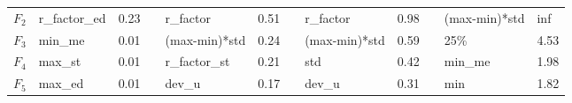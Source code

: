 \begin{table}[]
\begin{tabular}{|l|l|l|l|l|l|l|l|l|lll}
$F_2$                                        & \cellcolor[HTML]{FFCE93}r\_factor\_ed                            & \cellcolor[HTML]{FFCE93}0.23                                        &                                         & \cellcolor[HTML]{FFCE93}r\_factor                                & \cellcolor[HTML]{FFCE93}0.51                                        &                                         & \cellcolor[HTML]{FFCE93}r\_factor                                & \cellcolor[HTML]{FFCE93}0.98                                        & \multicolumn{1}{l|}{}                   & \multicolumn{1}{l|}{\cellcolor[HTML]{FFCE93}(max-min)*std}       & \multicolumn{1}{l|}{\cellcolor[HTML]{FFCE93} inf}                       \\ \cline{1-3} \cline{5-6} \cline{8-9} \cline{11-12} 
$F_3$                                        & \cellcolor[HTML]{FFCE93}min\_me                                  & \cellcolor[HTML]{FFCE93}0.01                                        &                                         & \cellcolor[HTML]{FFCE93}(max-min)*std                            & \cellcolor[HTML]{FFCE93}0.24                                        &                                         & \cellcolor[HTML]{FFCE93}(max-min)*std                            & \cellcolor[HTML]{FFCE93}0.59                                        & \multicolumn{1}{l|}{}                   & \multicolumn{1}{l|}{\cellcolor[HTML]{FFCE93}25\%}                & \multicolumn{1}{l|}{\cellcolor[HTML]{FFCE93}4.53}                   \\ \cline{1-3} \cline{5-6} \cline{8-9} \cline{11-12} 
$F_4$                                        & \cellcolor[HTML]{FFCE93}max\_st                                  & \cellcolor[HTML]{FFCE93}0.01                                        &                                         & \cellcolor[HTML]{FFCE93}r\_factor\_st                            & \cellcolor[HTML]{FFCE93}0.21                                        &                                         & \cellcolor[HTML]{FFCE93}std                                      & \cellcolor[HTML]{FFCE93}0.42                                        & \multicolumn{1}{l|}{}                   & \multicolumn{1}{l|}{\cellcolor[HTML]{FFCE93}min\_me}             & \multicolumn{1}{l|}{\cellcolor[HTML]{FFCE93}1.98}                   \\ \cline{1-3} \cline{5-6} \cline{8-9} \cline{11-12} 
$F_5$                                        & \cellcolor[HTML]{FFCE93}max\_ed                                  & \cellcolor[HTML]{FFCE93}0.01                                        &                                         & \cellcolor[HTML]{FFCE93}dev\_u                                   & \cellcolor[HTML]{FFCE93}0.17                                        &                                         & \cellcolor[HTML]{FFCE93}dev\_u                                   & \cellcolor[HTML]{FFCE93}0.31                                        & \multicolumn{1}{l|}{}                   & \multicolumn{1}{l|}{\cellcolor[HTML]{FFCE93}min}                 & \multicolumn{1}{l|}{\cellcolor[HTML]{FFCE93}1.82}                   \\ \cline{1-3} \cline{5-6} \cline{8-9} \cline{11-12} 

\end{tabular}
\end{table}
